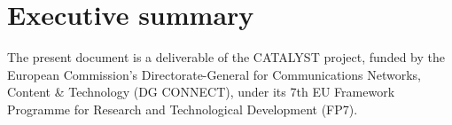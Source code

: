 \clearpage

\chapter{Executive summary}



\small
The present document is a deliverable of the CATALYST project, funded by the European Commission's Directorate-General for Communications Networks, Content \& Technology (DG CONNECT), under its 7th EU Framework Programme for Research and Technological Development (FP7).
\clearpage

